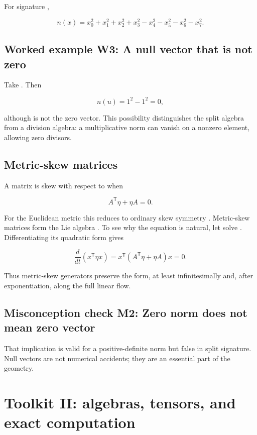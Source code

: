 \documentclass[11pt]{article}
\begin{document}
For signature \texttt{},

\[
n(x)=x_0^2+x_1^2+x_2^2+x_3^2
-x_4^2-x_5^2-x_6^2-x_7^2.
\]

\subsection{Worked example W3: A null vector that is not zero}

Take \texttt{}. Then

\[
n(u)=1^2-1^2=0,
\]

although \texttt{} is not the zero vector. This possibility distinguishes the split algebra from a division algebra: a multiplicative norm can vanish on a nonzero element, allowing zero divisors.

\subsection{Metric-skew matrices}

A matrix \texttt{} is skew with respect to \texttt{} when

\[
A^{\mathsf T}\eta+\eta A=0.
\]

For the Euclidean metric this reduces to ordinary skew symmetry \texttt{}. Metric-skew matrices form the Lie algebra \texttt{}. To see why the equation is natural, let \texttt{} solve \texttt{}. Differentiating its quadratic form gives

\[
\frac{d}{dt}(x^{\mathsf T}\eta x)
=x^{\mathsf T}(A^{\mathsf T}\eta+\eta A)x=0.
\]

Thus metric-skew generators preserve the form, at least infinitesimally and, after exponentiation, along the full linear flow.

\subsection{Misconception check M2: Zero norm does not mean zero vector}

That implication is valid for a positive-definite norm but false in split signature. Null vectors are not numerical accidents; they are an essential part of the geometry.

\section{Toolkit II: algebras, tensors, and exact computation}
\end{document}
